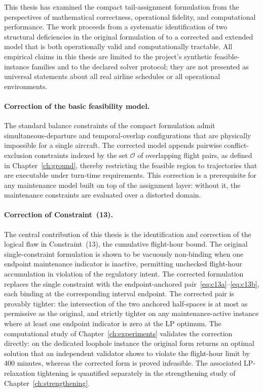 This thesis has examined the compact tail-assignment formulation from the perspectives of mathematical correctness, operational fidelity, and computational performance. The work proceeds from a systematic identification of two structural deficiencies in the original formulation of \citet{khaled2018compact} to a corrected and extended model that is both operationally valid and computationally tractable. All empirical claims in this thesis are limited to the project’s synthetic feasible-instance families and to the declared solver protocol; they are not presented as universal statements about all real airline schedules or all operational environments.

\paragraph{Correction of the basic feasibility model.}
The standard balance constraints of the compact formulation admit simultaneous-departure and temporal-overlap configurations that are physically impossible for a single aircraft. The corrected model appends pairwise conflict-exclusion constraints indexed by the set $\mathcal{O}$ of overlapping flight pairs, as defined in Chapter~\ref{ch:ground}, thereby restricting the feasible region to trajectories that are executable under turn-time requirements. This correction is a prerequisite for any maintenance model built on top of the assignment layer: without it, the maintenance constraints are evaluated over a distorted domain.

\paragraph{Correction of Constraint~(13).}
The central contribution of this thesis is the identification and correction of the logical flaw in Constraint~(13), the cumulative flight-hour bound. The original single-constraint formulation is shown to be vacuously non-binding when one endpoint maintenance indicator is inactive, permitting unchecked flight-hour accumulation in violation of the regulatory intent. The corrected formulation replaces the single constraint with the endpoint-anchored pair~\eqref{eq:c13a}--\eqref{eq:c13b}, each binding at the corresponding interval endpoint. The corrected pair is provably tighter: the intersection of the two anchored half-spaces is at most as permissive as the original, and strictly tighter on any maintenance-active instance where at least one endpoint indicator is zero at the LP optimum. The computational study of Chapter~\ref{ch:experiments} validates the correction directly: on the dedicated loophole instance the original form returns an optimal solution that an independent validator shows to violate the flight-hour limit by 400 minutes, whereas the corrected form is proved infeasible. The associated LP-relaxation tightening is quantified separately in the strengthening study of Chapter~\ref{ch:strengthening}.

